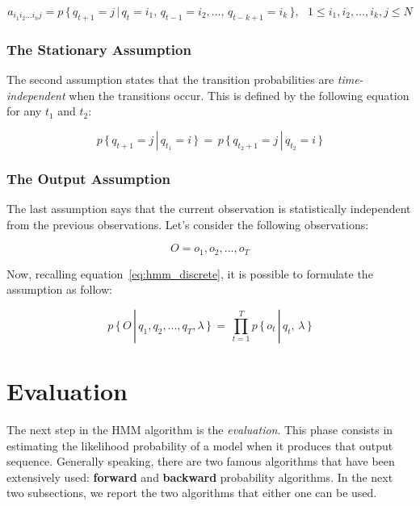 \begin{equation}
\label{eq:transition_nth_order}
a_{i_{1}i_{2}...i_{n}j} = p\, \{\, q_{t+1} = j \,|\, q_{t} = i_{1}, \, q_{t-1} = i_{2}, ... , \, q_{t-k+1} = i_{k} \, \}, \,\,\,\, 1 \leq i_{1},i_{2}, ... ,i_{k}, j \leq N
\end{equation}


\subsubsection{The Stationary Assumption}
The second assumption states that the transition probabilities are \textit{time-independent} when the transitions occur. This is defined by the following equation for any $t_{1}$ and $t_{2}$:

\begin{equation}
	p \, \{\, q_{t+1} = j \,|\, q_{t_{1}} = i\, \}\, = \,p \,\{\, q_{t_{2}+1} = j \,|\, q_{t_{2}} = i\, \}
\end{equation}

\subsubsection{The Output Assumption}
The last assumption says that the current observation is statistically independent from the previous observations. Let's consider the following observations:

\begin{equation}
	O = o_{1}, o_{2}, ... , o_{T}
\end{equation}

\noindent Now, recalling equation~\ref{eq:hmm_discrete}, it is possible to formulate the assumption as follow:

\begin{equation}
\label{eq:final_hmm}
	p \, \{\, O \, |\, q_{1},q_{2}, ... , q_{T}, \lambda \,\}\, = \, \prod_{t = 1}^{T} p \, \{ \, o_{t} \, | \, q_{t}, \, \lambda \,\}
\end{equation}

\section{Evaluation}
The next step in the HMM algorithm is the \textit{evaluation}. This phase consists in estimating the likelihood probability of a model when it produces that output sequence. Generally speaking, there are two famous algorithms that have been extensively used: \textbf{forward} and \textbf{backward} probability algorithms. In the next two subsections, we report the two algorithms that either one can be used.

